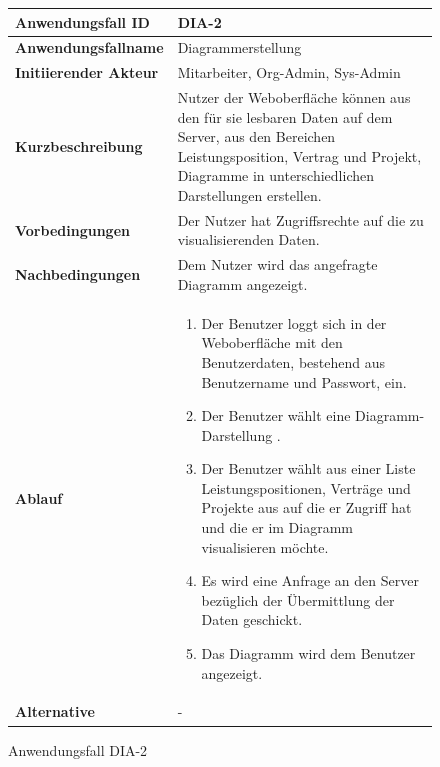 \begin{figure}[h]
	\centering
	\begin{tabularx}{\textwidth}{ X | X }
		\textbf{Anwendungsfall ID} & DIA-2 \\ \hline
		\textbf{Anwendungsfallname} & Diagrammerstellung\\ \hline
		\textbf{Initiierender Akteur} & Mitarbeiter, Org-Admin, Sys-Admin \\ \hline
		\textbf{Kurzbeschreibung} & Nutzer der Weboberfläche können aus den für sie lesbaren Daten auf dem Server, aus den Bereichen Leistungsposition, Vertrag und Projekt, Diagramme in unterschiedlichen Darstellungen erstellen.  \\ \hline
		\textbf{Vorbedingungen} & Der Nutzer hat Zugriffsrechte auf die zu visualisierenden Daten.  \\ \hline
		\textbf{Nachbedingungen} &  Dem Nutzer wird das angefragte Diagramm angezeigt.  \\ \hline
		\textbf{Ablauf} &
		\begin{enumerate}
			\item Der Benutzer loggt sich in der Weboberfläche mit den Benutzerdaten, bestehend aus Benutzername und Passwort, ein.
			\item Der Benutzer wählt eine Diagramm-Darstellung .
			\item Der Benutzer wählt aus einer Liste Leistungspositionen, Verträge und Projekte aus auf die er Zugriff hat und die er im Diagramm visualisieren möchte.
			\item Es wird eine Anfrage an den Server bezüglich der Übermittlung der Daten geschickt.
			\item Das Diagramm wird dem Benutzer angezeigt.
		\end{enumerate} \\ \hline

		\textbf{Alternative} & - \\ \hline
	\end{tabularx}
	\caption{Anwendungsfall DIA-2}
	\label{fig:anwendungsfall-DIA-2}
	
	
\end{figure}


\newpage

